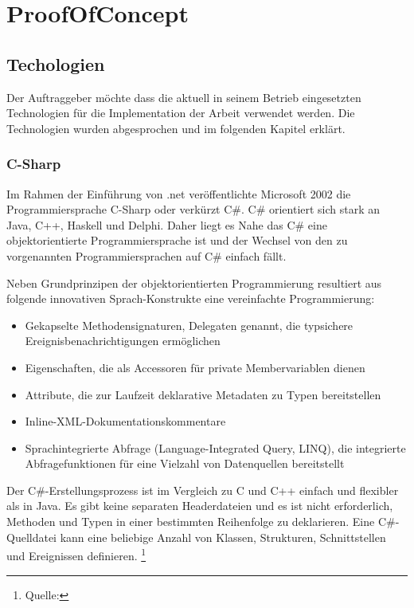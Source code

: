 \chapter{ProofOfConcept}\label{proofofconcept}

\section{Techologien}\label{techologien}

Der Auftraggeber möchte dass die aktuell in seinem Betrieb eingesetzten
Technologien für die Implementation der Arbeit verwendet werden. Die
Technologien wurden abgesprochen und im folgenden Kapitel erklärt.

\subsection{C-Sharp}\label{c-sharp}

Im Rahmen der Einführung von .net veröffentlichte Microsoft 2002 die
Programmiersprache C-Sharp oder verkürzt C\#. C\# orientiert sich stark
an Java, C++, Haskell und Delphi. Daher liegt es Nahe das C\# eine
objektorientierte Programmiersprache ist und der Wechsel von den zu
vorgenannten Programmiersprachen auf C\# einfach fällt.

Neben Grundprinzipen der objektorientierten Programmierung resultiert
aus folgende innovativen Sprach-Konstrukte eine vereinfachte
Programmierung:

\begin{itemize}
\tightlist
\item
  Gekapselte Methodensignaturen, Delegaten genannt, die typsichere
  Ereignisbenachrichtigungen ermöglichen
\item
  Eigenschaften, die als Accessoren für private Membervariablen dienen
\item
  Attribute, die zur Laufzeit deklarative Metadaten zu Typen
  bereitstellen
\item
  Inline-XML-Dokumentationskommentare
\item
  Sprachintegrierte Abfrage (Language-Integrated Query, LINQ), die
  integrierte Abfragefunktionen für eine Vielzahl von Datenquellen
  bereitstellt
\end{itemize}

Der C\#-Erstellungsprozess ist im Vergleich zu C und C++ einfach und
flexibler als in Java. Es gibt keine separaten Headerdateien und es ist
nicht erforderlich, Methoden und Typen in einer bestimmten Reihenfolge
zu deklarieren. Eine C\#-Quelldatei kann eine beliebige Anzahl von
Klassen, Strukturen, Schnittstellen und Ereignissen definieren.
\footnote{Quelle:\autocite{csharpbasic}}

